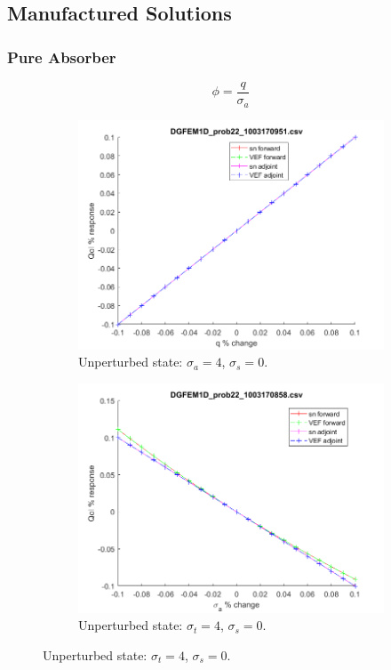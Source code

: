 \documentclass[12pt]{report}
\newcommand{\sigt}{\sigma_t}
\newcommand{\sigs}{\sigma_s}
\newcommand{\siga}{\sigma_a}
\begin{document}
\subsection{Manufactured Solutions}
\subsubsection{Pure Absorber}
\begin{equation}
\phi=\frac{q}{\sigma_a}
\end{equation}

\begin{figure}[H]
\label{Absorber}
\centering
\begin{subfigure}{.5\textwidth}
  \centering
  \includegraphics[width=.98\linewidth]{figures/22qSens.png}
  \caption{Unperturbed state: $\siga=4$, $\sigs=0$. }
  \label{fig:sfig1}
\end{subfigure}%
\begin{subfigure}{.5\textwidth}
  \centering
  \includegraphics[width=.98\linewidth]{figures/22sigaSens.png}
  \caption{Unperturbed state: $\sigt=4$, $\sigs=0$. }
  \label{fig:sfig2}
\end{subfigure}
\end{figure}
\end{document}
